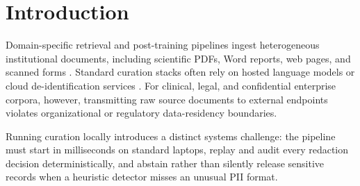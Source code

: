\documentclass{article}
\begin{document}
\section{Introduction}
\label{sec:intro}

Domain-specific retrieval and post-training pipelines ingest heterogeneous institutional documents, including scientific PDFs, Word reports, web pages, and scanned forms \citep{soldaini2024dolma,penedo2024fineweb}. Standard curation stacks often rely on hosted language models or cloud de-identification services \citep{ai4privacy2023,presidio2021}. For clinical, legal, and confidential enterprise corpora, however, transmitting raw source documents to external endpoints violates organizational or regulatory data-residency boundaries.

Running curation locally introduces a distinct systems challenge: the pipeline must start in milliseconds on standard laptops, replay and audit every redaction decision deterministically, and abstain rather than silently release sensitive records when a heuristic detector misses an unusual PII format.
\end{document}
